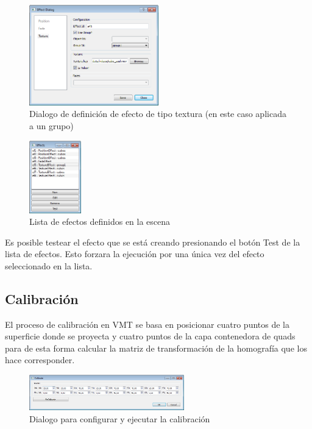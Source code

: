 \begin{figure}[H]
  \centering
    \includegraphics[width=0.5\textwidth]{./Cap5_vmt/vmt_EfectDialog3.png}
  \caption{Dialogo de definición de efecto de tipo textura (en este caso aplicada a un grupo)}
  \label{fig:VMT-EffectTexture}
\end{figure}

\begin{figure}[H]
  \centering
    \includegraphics[width=0.2\textwidth]{./Cap5_vmt/vmt_Efects.png}
  \caption{Lista de efectos definidos en la escena}
  \label{fig:VMT-EffectList}
\end{figure}

Es posible testear el efecto que se está creando presionando el botón Test de la lista de efectos. Esto forzara la ejecución por una única vez del efecto seleccionado en la lista.

\subsection{Calibración}

El proceso de calibración en VMT se basa en posicionar cuatro puntos de la superficie donde se proyecta y cuatro puntos de la capa contenedora de quads para de esta forma calcular la matriz de transformación de la homografía que los hace corresponder.

\begin{figure}[H]
  \centering
    \includegraphics[width=0.6\textwidth]{./Cap5_vmt/vmt_Calibrate.png}
  \caption{Dialogo para configurar y ejecutar la calibración}
  \label{fig:VMT-Calib}
\end{figure}

